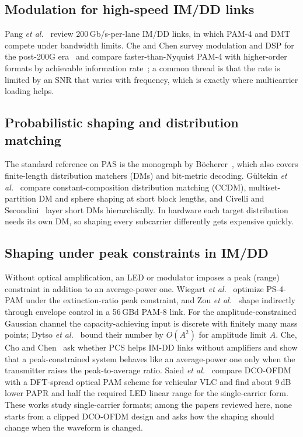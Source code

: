 \documentclass[conference]{IEEEtran}
\begin{document}
\subsection{Modulation for high-speed IM/DD links}
Pang \emph{et al.}~\cite{pang2020} review 200\,Gb/s-per-lane IM/DD links, in which PAM-4 and DMT compete under bandwidth limits. Che and Chen survey modulation and DSP for the post-200G era~\cite{che2024} and compare faster-than-Nyquist PAM-4 with higher-order formats by achievable information rate~\cite{che2022}; a common thread is that the rate is limited by an SNR that varies with frequency, which is exactly where multicarrier loading helps.

\subsection{Probabilistic shaping and distribution matching}
The standard reference on PAS is the monograph by B\"ocherer~\cite{bocherer2023}, which also covers finite-length distribution matchers (DMs) and bit-metric decoding. G\"ultekin \emph{et al.}~\cite{gultekin2020} compare constant-composition distribution matching (CCDM), multiset-partition DM and sphere shaping at short block lengths, and Civelli and Secondini~\cite{civelli2020} layer short DMs hierarchically. In hardware each target distribution needs its own DM, so shaping every subcarrier differently gets expensive quickly.

\subsection{Shaping under peak constraints in IM/DD}
Without optical amplification, an LED or modulator imposes a peak (range) constraint in addition to an average-power one. Wiegart \emph{et al.}~\cite{wiegart2021} optimize PS-4-PAM under the extinction-ratio peak constraint, and Zou \emph{et al.}~\cite{zou2026} shape indirectly through envelope control in a 56\,GBd PAM-8 link. For the amplitude-constrained Gaussian channel the capacity-achieving input is discrete with finitely many mass points; Dytso \emph{et al.}~\cite{dytso2020} bound their number by $O(A^2)$ for amplitude limit $A$. Che, Cho and Chen~\cite{che2021pcs} ask whether PCS helps IM-DD links without amplifiers and show that a peak-constrained system behaves like an average-power one only when the transmitter raises the peak-to-average ratio. Saied \emph{et al.}~\cite{saied2023} compare DCO-OFDM with a DFT-spread optical PAM scheme for vehicular VLC and find about 9\,dB lower PAPR and half the required LED linear range for the single-carrier form. These works study single-carrier formats; among the papers reviewed here, none starts from a clipped DCO-OFDM design and asks how the shaping should change when the waveform is changed.
\end{document}
